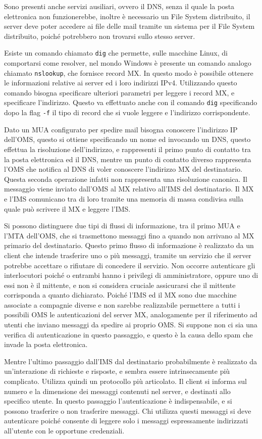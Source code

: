 \documentclass{article}
\numberwithin{equation}{subsection}
\begin{document}
Sono presenti anche servizi ausiliari, ovvero il DNS, senza il quale la posta elettronica non funzionerebbe, inoltre è necessario un File System distribuito, il server deve poter accedere ai file delle mail tramite un sistema per il File System distribuito, poiché potrebbero non trovarsi sullo stesso server. 

Esiste un comando chiamato \verb|dig| che permette, sulle macchine Linux, di comportarsi come resolver, nel mondo Windows è presente un comando analogo chiamato \verb|nslookup|, che fornisce record MX. In questo modo è possibile ottenere le informazioni relative ai server ed i loro indirizzi IPv4. Utilizzando questo comando bisogna specificare ulteriori parametri per leggere i record MX, e specificare l'indirizzo. Questo va effettuato anche con il comando \verb|dig| specificando dopo la flag \verb|-f| il tipo di record che si vuole leggere e l'indirizzo corrispondente. 


Dato un MUA configurato per spedire mail bisogna conoscere l'indirizzo IP dell'OMS, questo si ottiene specificando un nome ed invocando un DNS, questo effettua la risoluzione dell'indirizzo, e rappresenti il primo punto di contatto tra la posta elettronica ed il DNS, mentre un punto di contatto diverso rappresenta l'OMS che notifica al DNS di voler conoscere l'indirizzo MX del destinatario. Questa seconda operazione infatti non rappresenta una risoluzione canonica. Il messaggio viene inviato dall'OMS al MX relativo all'IMS del destinatario. 
Il MX e l'IMS comunicano tra di loro tramite una memoria di massa condivisa sulla quale può scrivere il MX e leggere l'IMS. 


Si possono distinguere due tipi di flussi di informazione, tra il primo MUA e l'MTA dell'OMS, che si trasmettono messaggi fino a quando non arrivano al MX primario del destinatario. 
Questo primo flusso di informazione è realizzato da un client che intende trasferire uno o più messaggi, tramite un servizio che il server potrebbe accettare o rifiutare di concedere il servizio. 
Non occorre autenticare gli interlocutori poiché o entrambi hanno i privilegi di amministratore, oppure uno di essi non è il mittente, e non si considera cruciale assicurarsi che il mittente corrisponda a quanto dichiarato. Poiché l'IMS ed il MX sono due macchine associate a compagnie diverse e non sarebbe realizzabile permettere a tutti i possibili OMS le autenticazioni del server MX, analogamente per il riferimento ad utenti che inviano messaggi da spedire ai proprio OMS. 
Si suppone non ci sia una verifica di autenticazione in questo passaggio, e questo è la causa dello spam che invade la posta elettronica. 


Mentre l'ultimo passaggio dall'IMS dal destinatario probabilmente è realizzato da un'interazione di richieste e risposte, e sembra essere intrinsecamente più complicato. Utilizza quindi un protocollo più articolato. 
Il client si informa sul numero e la dimensione dei messaggi contenuti nel server, e destinati allo specifico utente. In questo passaggio l'autenticazione è indispensabile, e si possono trasferire o non trasferire messaggi. 
Chi utilizza questi messaggi si deve autenticare poiché consente di leggere solo i messaggi espressamente indirizzati all'utente con le opportune credenziali. 
\end{document}
